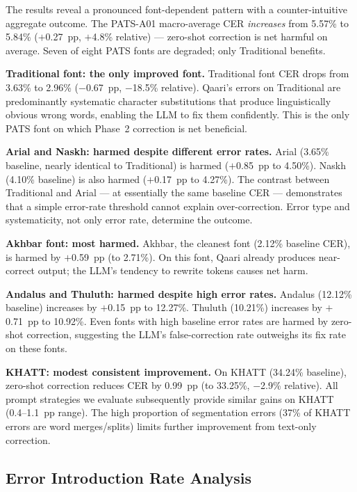 The results reveal a pronounced font-dependent pattern with a counter-intuitive
aggregate outcome. The PATS-A01 macro-average CER \emph{increases} from 5.57\%
to 5.84\% ($+$0.27~pp, $+$4.8\% relative) --- zero-shot correction is net
harmful on average. Seven of eight PATS fonts are degraded; only Traditional
benefits.

\textbf{Traditional font: the only improved font.}
Traditional font CER drops from 3.63\% to 2.96\% ($-$0.67~pp, $-$18.5\%
relative). Qaari's errors on Traditional are predominantly systematic
character substitutions that produce linguistically obvious wrong words,
enabling the LLM to fix them confidently. This is the only PATS font on
which Phase~2 correction is net beneficial.

\textbf{Arial and Naskh: harmed despite different error rates.}
Arial (3.65\% baseline, nearly identical to Traditional) is harmed
($+$0.85~pp to 4.50\%). Naskh (4.10\% baseline) is also harmed ($+$0.17~pp
to 4.27\%). The contrast between Traditional and Arial --- at essentially
the same baseline CER --- demonstrates that a simple error-rate threshold
cannot explain over-correction. Error type and systematicity, not only error
rate, determine the outcome.

\textbf{Akhbar font: most harmed.}
Akhbar, the cleanest font (2.12\% baseline CER), is harmed by $+$0.59~pp
(to 2.71\%). On this font, Qaari already produces near-correct output;
the LLM's tendency to rewrite tokens causes net harm.

\textbf{Andalus and Thuluth: harmed despite high error rates.}
Andalus (12.12\% baseline) increases by $+$0.15~pp to 12.27\%. Thuluth
(10.21\%) increases by $+$0.71~pp to 10.92\%. Even fonts with high baseline
error rates are harmed by zero-shot correction, suggesting the LLM's
false-correction rate outweighs its fix rate on these fonts.

\textbf{KHATT: modest consistent improvement.}
On KHATT (34.24\% baseline), zero-shot correction reduces CER by 0.99~pp
(to 33.25\%, $-$2.9\% relative). All prompt strategies we evaluate
subsequently provide similar gains on KHATT (0.4--1.1~pp range). The high
proportion of segmentation errors (37\% of KHATT errors are word
merges/splits) limits further improvement from text-only correction.

\subsection{Error Introduction Rate Analysis}
\label{subsec:res_p2_intro}

